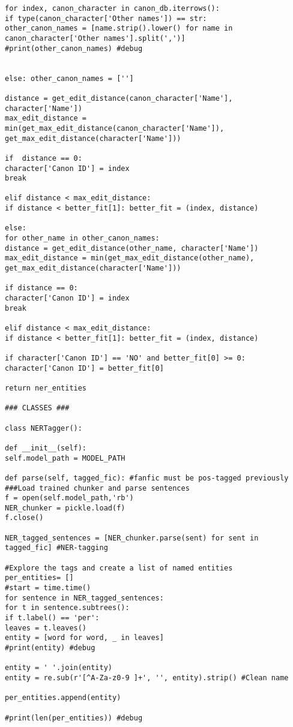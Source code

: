 \documentclass{pre-tfg}
\begin{document}
\begin{lstlisting}[style=consola]
for index, canon_character in canon_db.iterrows():
if type(canon_character['Other names']) == str:
other_canon_names = [name.strip().lower() for name in canon_character['Other names'].split(',')]
#print(other_canon_names) #debug


else: other_canon_names = ['']

distance = get_edit_distance(canon_character['Name'], character['Name'])
max_edit_distance = min(get_max_edit_distance(canon_character['Name']), get_max_edit_distance(character['Name']))

if  distance == 0:
character['Canon ID'] = index
break

elif distance < max_edit_distance:
if distance < better_fit[1]: better_fit = (index, distance)

else:
for other_name in other_canon_names:
distance = get_edit_distance(other_name, character['Name'])
max_edit_distance = min(get_max_edit_distance(other_name), get_max_edit_distance(character['Name']))

if distance == 0:
character['Canon ID'] = index
break

elif distance < max_edit_distance:
if distance < better_fit[1]: better_fit = (index, distance)

if character['Canon ID'] == 'NO' and better_fit[0] >= 0:
character['Canon ID'] = better_fit[0]

return ner_entities

### CLASSES ###

class NERTagger():

def __init__(self):
self.model_path = MODEL_PATH 

def parse(self, tagged_fic): #fanfic must be pos-tagged previously
###Load trained chunker and parse sentences
f = open(self.model_path,'rb')
NER_chunker = pickle.load(f)
f.close()

NER_tagged_sentences = [NER_chunker.parse(sent) for sent in tagged_fic] #NER-tagging

#Explore the tags and create a list of named entities
per_entities= []
#start = time.time() 
for sentence in NER_tagged_sentences:
for t in sentence.subtrees():
if t.label() == 'per': 
leaves = t.leaves()
entity = [word for word, _ in leaves]
#print(entity) #debug

entity = ' '.join(entity)
entity = re.sub(r'[^A-Za-z0-9 ]+', '', entity).strip() #Clean name

per_entities.append(entity)

#print(len(per_entities)) #debug


\end{lstlisting}
\end{document}
